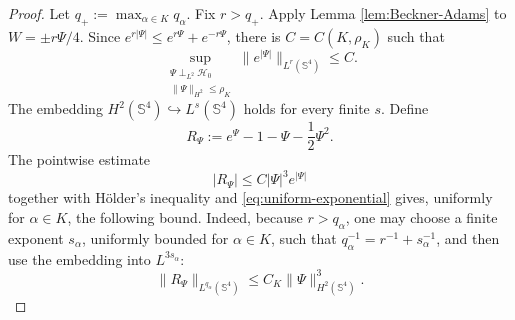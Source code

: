 \documentclass[11pt]{article}
\numberwithin{equation}{section}
\begin{document}
\begin{proof}
Let \(q_{+}:=\max_{\alpha\in K}q_{\alpha}\). Fix \(r>q_{+}\). Apply Lemma
\ref{lem:Beckner-Adams} to \(W=\pm r\Psi/4\). Since
\(e^{r|\Psi|}\leq e^{r\Psi}+e^{-r\Psi}\), there is \(C=C(K,\rho_K)\) such that
\begin{equation}\label{eq:uniform-exponential}
\sup_{\substack{\Psi\perp_{L^{2}}\mathcal H_{0}\\
\|\Psi\|_{H^{2}}\leq\rho_K}}
\|e^{|\Psi|}\|_{L^{r}(\mathbb S^{4})}\leq C.
\end{equation}
The embedding \(H^{2}(\mathbb S^{4})\hookrightarrow L^{s}(\mathbb S^{4})\)
holds for every finite \(s\). Define
\begin{equation*}
R_{\Psi}:=e^{\Psi}-1-\Psi-\frac12\Psi^{2}.
\end{equation*}
The pointwise estimate
\[
|R_{\Psi}|\leq C|\Psi|^{3}e^{|\Psi|}
\]
together with H\"older's inequality and \eqref{eq:uniform-exponential} gives,
uniformly for \(\alpha\in K\), the following bound. Indeed, because
\(r>q_\alpha\), one may choose a finite exponent \(s_\alpha\), uniformly
bounded for \(\alpha\in K\), such that
\(q_\alpha^{-1}=r^{-1}+s_\alpha^{-1}\), and then use the embedding into
\(L^{3s_\alpha}\):
\begin{equation}\label{eq:exp-remainder}
\|R_{\Psi}\|_{L^{q_{\alpha}}(\mathbb S^{4})}
\leq C_{K}\|\Psi\|_{H^{2}(\mathbb S^{4})}^{3}.
\end{equation}


\end{proof}
\end{document}
